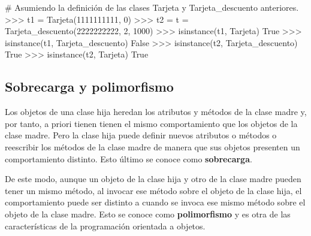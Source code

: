 \documentclass[
  spanish,
  a4paper,
]{scrreport}
\newenvironment{Shaded}{\begin{snugshade}}{\end{snugshade}}
\newcommand{\BuiltInTok}[1]{\textcolor[rgb]{0.00,0.23,0.31}{#1}}
\newcommand{\CommentTok}[1]{\textcolor[rgb]{0.37,0.37,0.37}{#1}}
\newcommand{\DecValTok}[1]{\textcolor[rgb]{0.68,0.00,0.00}{#1}}
\newcommand{\NormalTok}[1]{\textcolor[rgb]{0.00,0.23,0.31}{#1}}
\newcommand{\OperatorTok}[1]{\textcolor[rgb]{0.37,0.37,0.37}{#1}}
\newcommand{\StringTok}[1]{\textcolor[rgb]{0.13,0.47,0.30}{#1}}
\newcommand{\VariableTok}[1]{\textcolor[rgb]{0.07,0.07,0.07}{#1}}
\begin{document}
\begin{Shaded}
\begin{Highlighting}[]
\CommentTok{\# Asumiendo la definición de las clases Tarjeta y Tarjeta\_descuento anteriores.}
\OperatorTok{\textgreater{}\textgreater{}\textgreater{}}\NormalTok{ t1 }\OperatorTok{=}\NormalTok{ Tarjeta(}\StringTok{\textquotesingle{}1111111111\textquotesingle{}}\NormalTok{, }\DecValTok{0}\NormalTok{)}
\OperatorTok{\textgreater{}\textgreater{}\textgreater{}}\NormalTok{ t2 }\OperatorTok{=}\NormalTok{ t }\OperatorTok{=}\NormalTok{ Tarjeta\_descuento(}\StringTok{\textquotesingle{}2222222222\textquotesingle{}}\NormalTok{, }\DecValTok{2}\NormalTok{, }\DecValTok{1000}\NormalTok{)}
\OperatorTok{\textgreater{}\textgreater{}\textgreater{}} \BuiltInTok{isinstance}\NormalTok{(t1, Tarjeta)}
\VariableTok{True}
\OperatorTok{\textgreater{}\textgreater{}\textgreater{}} \BuiltInTok{isinstance}\NormalTok{(t1, Tarjeta\_descuento)}
\VariableTok{False}
\OperatorTok{\textgreater{}\textgreater{}\textgreater{}} \BuiltInTok{isinstance}\NormalTok{(t2, Tarjeta\_descuento)}
\VariableTok{True}
\OperatorTok{\textgreater{}\textgreater{}\textgreater{}} \BuiltInTok{isinstance}\NormalTok{(t2, Tarjeta)}
\VariableTok{True}
\end{Highlighting}
\end{Shaded}

\subsection{Sobrecarga y polimorfismo}\label{sobrecarga-y-polimorfismo}

Los objetos de una clase hija heredan los atributos y métodos de la
clase madre y, por tanto, a priori tienen tienen el mismo comportamiento
que los objetos de la clase madre. Pero la clase hija puede definir
nuevos atributos o métodos o reescribir los métodos de la clase madre de
manera que sus objetos presenten un comportamiento distinto. Esto último
se conoce como \textbf{sobrecarga}.

De este modo, aunque un objeto de la clase hija y otro de la clase madre
pueden tener un mismo método, al invocar ese método sobre el objeto de
la clase hija, el comportamiento puede ser distinto a cuando se invoca
ese mismo método sobre el objeto de la clase madre. Esto se conoce como
\textbf{polimorfismo} y es otra de las características de la
programación orientada a objetos.
\end{document}
